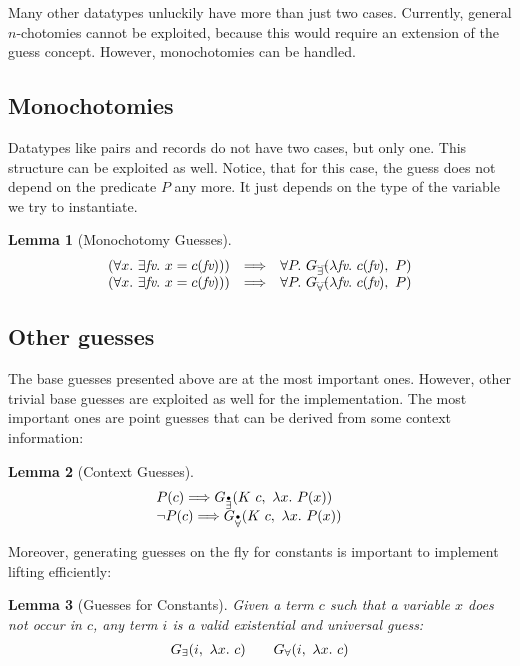 \documentclass[a4paper,12pt,DIV=12,oneside]{scrbook}
\newcommand{\fv}{\textit{fv}}
\newtheorem{lemma}{Lemma}[section]
\theoremstyle{definition}
\theoremstyle{remark}
\newcommand{\GE}{\ensuremath{G_\exists}}
\newcommand{\GEP}{\ensuremath{G_{\accentset{\bullet}{\exists}}}}
\newcommand{\GEG}{\ensuremath{G_{\accentset{\_\,\_}{\exists}}}}
\newcommand{\GU}{\ensuremath{G_\forall}}
\newcommand{\GUP}{\ensuremath{G_{\accentset{\bullet}{\forall}}}}
\newcommand{\GUG}{\ensuremath{G_{\accentset{\_\,\_}{\forall}}}}
\begin{document}
Many other datatypes unluckily have more than just two
cases. Currently, general $n$-chotomies cannot be exploited, because
this would require an extension of the guess concept.  However,
monochotomies can be handled.

\subsection{Monochotomies}
Datatypes like pairs and records do not have two cases, but only one. This
structure can be exploited as well. Notice, that for this case, the guess does not depend on the predicate $P$ any
more. It just depends on the type of the variable we try to instantiate.
%
\begin{lemma}[Monochotomy Guesses]\label{lemma_guesses_monochotomy}
\[
\begin{array}{l@{\quad}l@{\quad}l}
(\forall x.\ \exists \fv.\ x = c(\fv))) & \Longrightarrow &
\forall P.\ \GEG(\lambda \fv.\ c(\fv),\ P) \\
(\forall x.\ \exists \fv.\ x = c(\fv))) & \Longrightarrow &
\forall P.\ \GUG(\lambda \fv.\ c(\fv),\ P) \\
\end{array}
\]
\end{lemma}

\subsection{Other guesses}
The base guesses presented above are at the most important ones. However, other
trivial base guesses are exploited as well for the implementation. 
The most important ones are point guesses that can be derived 
from some context information:
%
\begin{lemma}[Context Guesses]\label{lemma_guesses_context}
\[
\begin{array}{l@{\quad\quad}l}
P(c) \Longrightarrow \GEP(K\ c,\ \lambda x.\ P(x))  \\
\neg P(c) \Longrightarrow \GUP(K\ c,\ \lambda x.\ P(x)) 
\end{array}
\]
\end{lemma}
%
\noindent
Moreover, generating guesses on the fly for constants is important to
implement lifting efficiently:
%
\begin{lemma}[Guesses for Constants]\label{lemma_guesses_const}
Given a term $c$ such that a variable $x$ does not occur in $c$, any term $i$ is a 
valid existential and universal guess: 
\[
\begin{array}{l@{\quad\quad}l}
\GE(i,\ \lambda x.\ c) & \GU(i,\ \lambda x.\ c) 
\end{array}
\]
\end{lemma}
\end{document}
